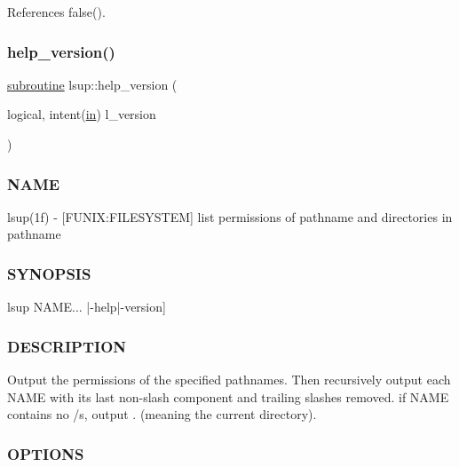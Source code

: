 References false().

\mbox{\label{lsup_8f90_a7566fe8ce05250d40d981110b710d428}} 
\subsubsection{\texorpdfstring{help\+\_\+version()}{help\_version()}}
{\footnotesize\ttfamily \hyperlink{M__stopwatch_83_8txt_acfbcff50169d691ff02d4a123ed70482}{subroutine} lsup\+::help\+\_\+version (\begin{DoxyParamCaption}\item[{logical, intent(\hyperlink{M__journal_83_8txt_afce72651d1eed785a2132bee863b2f38}{in})}]{l\+\_\+version }\end{DoxyParamCaption})}



\subsubsection*{N\+A\+ME}

lsup(1f) -\/ \mbox{[}F\+U\+N\+IX\+:F\+I\+L\+E\+S\+Y\+S\+T\+EM\mbox{]} list permissions of pathname and directories in pathname 

\subsubsection*{S\+Y\+N\+O\+P\+S\+IS}

\begin{DoxyVerb}lsup NAME... |-help|-version]
\end{DoxyVerb}


\subsubsection*{D\+E\+S\+C\+R\+I\+P\+T\+I\+ON}

Output the permissions of the specified pathnames. Then recursively output each N\+A\+ME with its last non-\/slash component and trailing slashes removed. if N\+A\+ME contains no /\textquotesingle{}s, output \textquotesingle{}.\textquotesingle{} (meaning the current directory).

\subsubsection*{O\+P\+T\+I\+O\+NS}

